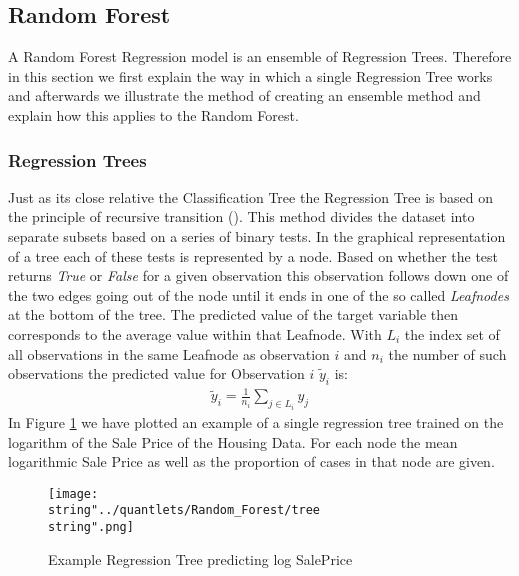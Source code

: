 \subsection{Random Forest}
A Random Forest Regression model is an ensemble of Regression Trees. Therefore in this section we first explain the way in which a single Regression Tree works and afterwards we illustrate the method of creating an ensemble method and explain how this applies to the Random Forest.
\subsubsection{Regression Trees}
Just as its close relative the Classification Tree the Regression Tree is based on the principle of recursive transition (\cite{liaw_classification_2002}). This method divides the dataset into separate subsets based on a series of binary tests. In the graphical representation of a tree each of these tests is represented by a node. Based on whether the test returns \textit{True} or \textit{False} for a given observation this observation follows down one of the two edges going out of the node until it ends in one of the so called \textit{Leafnodes} at the bottom of the tree. The predicted value of the target variable then corresponds to the average value within that Leafnode. With $L_i$ the index set of all observations in the same Leafnode as observation $i$ and $n_i$ the number of such observations the predicted value for Observation $i$ $\tilde{y}_i$ is:
\begin{align}
\tilde{y}_i = \frac{1}{n_i}\sum_{j \in L_i} y_j
\end{align}
In Figure  \ref{fig:tree} we have plotted an example of a single regression tree trained on the logarithm of the Sale Price of the Housing Data. For each node the mean logarithmic Sale Price as well as the proportion of cases in that node are given. 
\begin{figure}
  \centering
\texttt{[image: \\string"../quantlets/Random\_Forest/tree\\string".png]}
  \caption{Example Regression Tree predicting log SalePrice}\label{fig:tree}
\end{figure}

